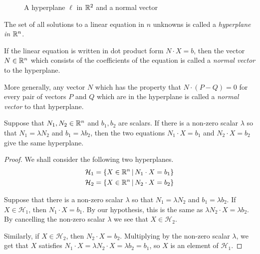 \documentclass[elementsmain.tex]{subfiles}
\begin{document}
\begin{figure}[h]
\centering
{}
\caption{A hyperplane $\ell$ in $\mathbb{R}^2$ and a normal vector}
\label{fig:general-line}
\end{figure}


\begin{definition}
The set of all solutions to a linear equation in $n$ unknowns is called a \emph{hyperplane in $\mathbb{R}^n$}. 

If the linear equation is written in dot product form $N\cdot X = b$, then the vector $N\in\mathbb{R}^n$ which consists of the coefficients of the equation is called a \emph{normal vector} to the hyperplane.

More generally, any vector $N$ which has the property that $N\cdot (P-Q) = 0$ for every pair of vectors $P$ and $Q$ which are in the hyperplane is called a \emph{normal vector} to that hyperplane.
\end{definition}

\begin{theorem}\label{thm:rescaling-hyperplane}
Suppose that $N_1, N_2 \in \mathbb{R}^n$ and $b_1, b_2$ are scalars. If there is a non-zero scalar $\lambda$ so that $N_1 = \lambda N_2$ and $b_1 = \lambda b_2$, then the two equations $N_1 \cdot X = b_1$ and $N_2 \cdot X = b_2$ give the same hyperplane.
\end{theorem}

\begin{proof}
We shall consider the following two hyperplanes.
\begin{align*}
\mathcal{H}_1 & = \left\{ X \in \mathbb{R}^n \,\middle|\, N_1 \cdot X = b_1 \right\} \\
\mathcal{H}_2 & = \left\{ X \in \mathbb{R}^n \,\middle|\, N_2 \cdot X = b_2 \right\} 
\end{align*}

Suppose that there is a non-zero scalar $\lambda$ so that $N_1 = \lambda N_2$ and $b_1 = \lambda b_2$. If $X \in \mathcal{H}_1$, then $N_1 \cdot X = b_1$. By our hypothesis, this is the same as $\lambda N_2 \cdot X = \lambda b_2$. By cancelling the non-zero scalar $\lambda$ we see that $X \in \mathcal{H}_2$. 

Similarly, if $X \in \mathcal{H}_2$, then $N_2 \cdot X = b_2$. Multiplying by the non-zero scalar $\lambda$, we get that $X$ satisfies $N_1 \cdot X = \lambda N_2 \cdot X = \lambda b_2 = b_1$, so $X$ is an element of $\mathcal{H}_1$. 
\end{proof}
\end{document}
